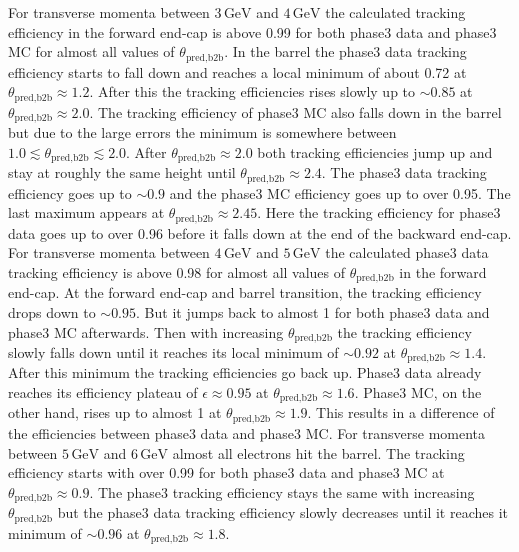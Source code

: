 \documentclass[a4paper,11pt,twosided,final,german,openbib,pdftex,listof=totoc,bibliography=totoc]{scrbook}
\begin{document}
For transverse momenta between $3\,\textrm{GeV}$ and $4\,\textrm{GeV}$ the calculated tracking efficiency in the forward end-cap is above 0.99 for both phase3 data and phase3 MC for almost all values of $\theta_{\textrm{pred,b2b}}$. In the barrel the phase3 data tracking efficiency starts to fall down and reaches a local minimum of about 0.72 at $\theta_{\textrm{pred,b2b}} \approx 1.2$. After this the tracking efficiencies rises slowly up to $\sim 0.85$ at $\theta_{\textrm{pred,b2b}} \approx 2.0$. The tracking efficiency of phase3 MC also falls down in the barrel but due to the large errors the minimum is somewhere between $1.0 \lesssim \theta_{\textrm{pred,b2b}} \lesssim 2.0$. After $\theta_{\textrm{pred,b2b}} \approx 2.0$ both tracking efficiencies jump up and stay at roughly the same height until $\theta_{\textrm{pred,b2b}} \approx 2.4$. The phase3 data tracking efficiency goes up to $\sim 0.9$ and the phase3 MC efficiency goes up to over 0.95. The last maximum appears at $\theta_{\textrm{pred,b2b}} \approx 2.45$. Here the tracking efficiency for phase3 data goes up to over 0.96 before it  falls down at the end of the backward end-cap.
For transverse momenta between $4\,\textrm{GeV}$ and $5\,\textrm{GeV}$ the calculated phase3 data tracking efficiency is above 0.98 for almost all values of $\theta_{\textrm{pred,b2b}}$ in the forward end-cap. At the forward end-cap and barrel transition, the tracking efficiency drops down to $\sim 0.95$. But it jumps back to almost 1 for both phase3 data and phase3 MC afterwards. Then with increasing $\theta_{\textrm{pred,b2b}}$ the tracking efficiency slowly falls down until it reaches its local minimum of $\sim 0.92$ at $\theta_{\textrm{pred,b2b}} \approx 1.4$. After this minimum the tracking efficiencies go back up. Phase3 data already reaches its efficiency plateau of $\epsilon \approx 0.95 $ at $\theta_{\textrm{pred,b2b}} \approx 1.6$. Phase3 MC, on the other hand, rises up to  almost 1 at $\theta_{\textrm{pred,b2b}} \approx 1.9$. This results in a difference of the efficiencies between phase3 data and phase3 MC.
For transverse momenta between $5\,\textrm{GeV}$ and $6\,\textrm{GeV}$ almost all electrons hit the barrel. The tracking efficiency starts with over 0.99 for both phase3 data and phase3 MC at $\theta _{\textrm{pred,b2b}}\approx 0.9$. The phase3 tracking efficiency stays the same with increasing $\theta_{\textrm{pred,b2b}}$ but the phase3 data tracking efficiency slowly decreases until it reaches it minimum of $\sim 0.96$ at $\theta_{\textrm{pred,b2b}} \approx 1.8$.
\end{document}
